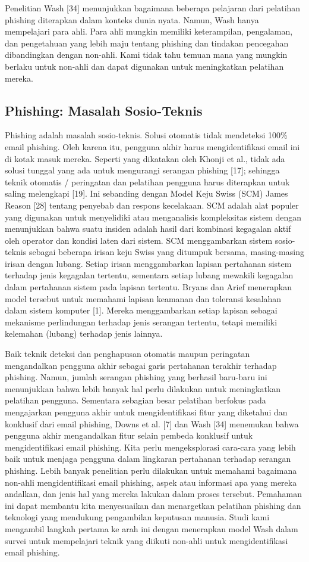 \documentclass[lettersize,journal]{IEEEtran}
\begin{document}
Penelitian Wash [34] menunjukkan bagaimana beberapa pelajaran dari pelatihan
phishing diterapkan dalam konteks dunia nyata. Namun, Wash hanya mempelajari
para ahli. Para ahli mungkin memiliki keterampilan, pengalaman, dan pengetahuan
yang lebih maju tentang phishing dan tindakan pencegahan dibandingkan dengan
non-ahli. Kami tidak tahu temuan mana yang mungkin berlaku untuk non-ahli dan
dapat digunakan untuk meningkatkan pelatihan mereka.

\subsection{Phishing: Masalah Sosio-Teknis}

Phishing adalah masalah sosio-teknis. Solusi otomatis tidak mendeteksi 100\%
email phishing. Oleh karena itu, pengguna akhir harus mengidentifikasi email
ini di kotak masuk mereka. Seperti yang dikatakan oleh Khonji et al., tidak ada
solusi tunggal yang ada untuk mengurangi serangan phishing [17]; sehingga
teknik otomatis / peringatan dan pelatihan pengguna harus diterapkan untuk
saling melengkapi [19]. Ini sebanding dengan Model Keju Swiss (SCM) James
Reason [28] tentang penyebab dan respons kecelakaan. SCM adalah alat populer
yang digunakan untuk menyelidiki atau menganalisis kompleksitas sistem dengan
menunjukkan bahwa suatu insiden adalah hasil dari kombinasi kegagalan aktif
oleh operator dan kondisi laten dari sistem. SCM menggambarkan sistem
sosio-teknis sebagai beberapa irisan keju Swiss yang ditumpuk bersama,
masing-masing irisan dengan lubang. Setiap irisan menggambarkan lapisan
pertahanan sistem terhadap jenis kegagalan tertentu, sementara setiap lubang
mewakili kegagalan dalam pertahanan sistem pada lapisan tertentu. Bryans dan
Arief menerapkan model tersebut untuk memahami lapisan keamanan dan toleransi
kesalahan dalam sistem komputer [1]. Mereka menggambarkan setiap lapisan
sebagai mekanisme perlindungan terhadap jenis serangan tertentu, tetapi
memiliki kelemahan (lubang) terhadap jenis lainnya.

Baik teknik deteksi dan penghapusan otomatis maupun peringatan mengandalkan
pengguna akhir sebagai garis pertahanan terakhir terhadap phishing. Namun,
jumlah serangan phishing yang berhasil baru-baru ini menunjukkan bahwa lebih
banyak hal perlu dilakukan untuk meningkatkan pelatihan pengguna.
Sementara sebagian besar pelatihan berfokus pada mengajarkan pengguna akhir
untuk mengidentifikasi fitur yang diketahui dan konklusif dari email phishing,
Downs et al. [7] dan Wash [34] menemukan bahwa pengguna akhir mengandalkan
fitur selain pembeda konklusif untuk mengidentifikasi email phishing. Kita
perlu mengeksplorasi cara-cara yang lebih baik untuk menjaga pengguna dalam
lingkaran pertahanan terhadap serangan phishing. Lebih banyak penelitian perlu
dilakukan untuk memahami bagaimana non-ahli mengidentifikasi email phishing,
aspek atau informasi apa yang mereka andalkan, dan jenis hal yang mereka
lakukan dalam proses tersebut. Pemahaman ini dapat membantu kita menyesuaikan
dan menargetkan pelatihan phishing dan teknologi yang mendukung pengambilan
keputusan manusia. Studi kami mengambil langkah pertama ke arah ini dengan
menerapkan model Wash dalam survei untuk mempelajari teknik yang diikuti
non-ahli untuk mengidentifikasi email phishing.
\end{document}
